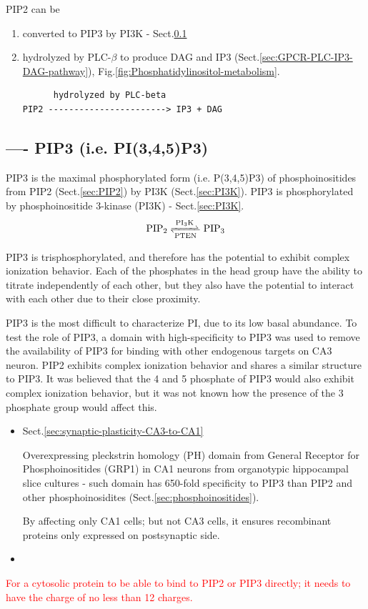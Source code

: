 PIP2 can be 
\begin{enumerate}
  \item converted to PIP3 by PI3K - Sect.\ref{sec:PIP3}
  
  \item hydrolyzed by PLC-$\beta$ to produce DAG and IP3
  (Sect.\ref{sec:GPCR-PLC-IP3-DAG-pathway}),
  Fig.\ref{fig:Phosphatidylinositol-metabolism}. 

\begin{Verbatim}
      hydrolyzed by PLC-beta 
PIP2 -----------------------> IP3 + DAG
\end{Verbatim}

\end{enumerate}




\subsection{---- PIP3 (i.e. PI(3,4,5)P3)}
\label{sec:PIP3}

PIP3 is the maximal phosphorylated form (i.e. P(3,4,5)P3) of phosphoinositides
from PIP2 (Sect.\ref{sec:PIP2}) by PI3K (Sect.\ref{sec:PI3K}).
PIP3 is phosphorylated by phosphoinositide 3-kinase (PI3K) -
Sect.\ref{sec:PI3K}.
\begin{equation}
\ce{PIP2 <=>[PI3K][PTEN] PIP3}
\end{equation}

PIP3 is trisphosphorylated, and therefore has the potential to exhibit complex ionization
behavior. Each of the phosphates in the head group have the ability to titrate independently of
each other, but they also have the potential to interact with each other due to their close
proximity. 

PIP3 is the most difficult to characterize PI, due to its low basal abundance.
To test the role of PIP3, a domain with high-specificity to PIP3 was used to
remove the availability of PIP3 for binding with other endogenous targets on CA3
neuron. PIP2 exhibits complex ionization behavior and shares a similar structure
to PIP3. It was believed that the 4 and 5 phosphate of PIP3 would also exhibit
complex ionization behavior, but it was not known how the presence of the 3
phosphate group would affect this.


\begin{itemize}
  \item Sect.\ref{sec:synaptic-plasticity-CA3-to-CA1}

Overexpressing pleckstrin homology (PH) domain from General Receptor
for Phosphoinositides (GRP1) in CA1 neurons from organotypic hippocampal slice
cultures - such domain has 650-fold specificity to PIP3 than PIP2 and other
phosphoinosidites (Sect.\ref{sec:phosphoinositides}).

By affecting only CA1 cells; but not CA3 cells, it ensures recombinant proteins
only expressed on postsynaptic side.
  
  \item 
\end{itemize}
\textcolor{red}{For a cytosolic protein to be able to bind to PIP2 or PIP3
directly; it needs to have the charge of no less than 12 charges.}

